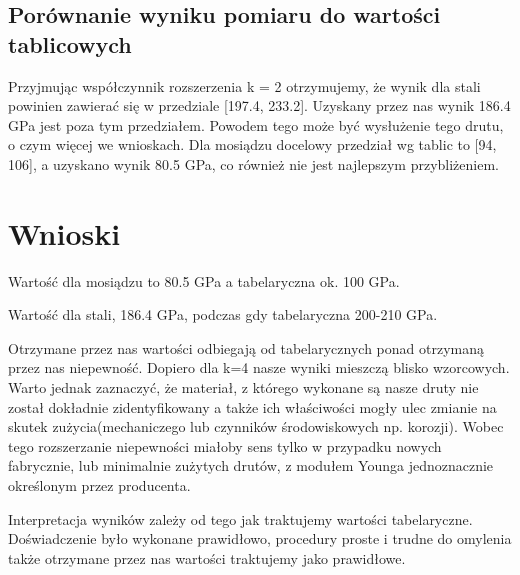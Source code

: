 \documentclass{article}
\begin{document}
\subsection{Porównanie wyniku pomiaru do wartości tablicowych}
Przyjmując współczynnik rozszerzenia k = 2 otrzymujemy, że wynik dla stali powinien zawierać się w przedziale [197.4, 233.2]. Uzyskany przez nas wynik 186.4 GPa jest poza tym przedziałem. Powodem tego może być wysłużenie tego drutu, o czym więcej we wnioskach.
Dla mosiądzu docelowy przedział wg tablic to [94, 106], a uzyskano wynik 80.5 GPa, co również nie jest najlepszym przybliżeniem.
\section{Wnioski}
Wartość dla mosiądzu to 80.5 GPa a tabelaryczna ok. 100 GPa.

Wartość dla stali, 186.4 GPa, podczas gdy tabelaryczna 200-210 GPa.

Otrzymane przez nas wartości odbiegają od tabelarycznych ponad otrzymaną przez nas niepewność. Dopiero dla k=4 nasze wyniki mieszczą blisko wzorcowych. Warto jednak zaznaczyć, że materiał, z którego wykonane są nasze druty nie został dokładnie zidentyfikowany a także ich właściwości mogły ulec zmianie na skutek zużycia(mechaniczego lub czynników środowiskowych np. korozji). Wobec tego rozszerzanie niepewności miałoby sens tylko w przypadku nowych fabrycznie, lub minimalnie zużytych drutów, z modułem Younga jednoznacznie określonym przez producenta.

Interpretacja wyników zależy od tego jak traktujemy wartości tabelaryczne. Doświadczenie było wykonane prawidłowo, procedury proste i trudne do omylenia także otrzymane przez nas wartości traktujemy jako prawidłowe.





\end{document}
